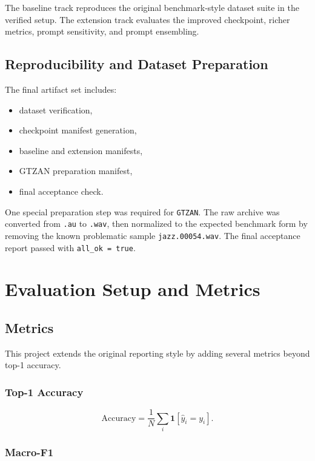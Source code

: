 \documentclass[11pt]{article}
\newcommand{\dataset}[1]{\texttt{#1}}
\begin{document}
The baseline track reproduces the original benchmark-style dataset suite in the
verified setup. The extension track evaluates the improved checkpoint, richer
metrics, prompt sensitivity, and prompt ensembling.

\subsection{Reproducibility and Dataset Preparation}

The final artifact set includes:
\begin{itemize}[leftmargin=1.25em]
  \item dataset verification,
  \item checkpoint manifest generation,
  \item baseline and extension manifests,
  \item GTZAN preparation manifest,
  \item final acceptance check.
\end{itemize}

One special preparation step was required for \dataset{GTZAN}. The raw archive
was converted from \dataset{.au} to \dataset{.wav}, then normalized to the
expected benchmark form by removing the known problematic sample
\dataset{jazz.00054.wav}. The final acceptance report passed with
\dataset{all\_ok = true}.

\section{Evaluation Setup and Metrics}

\subsection{Metrics}

This project extends the original reporting style by adding several metrics
beyond top-1 accuracy.

\subsubsection*{Top-1 Accuracy}

\begin{equation}
\text{Accuracy} = \frac{1}{N} \sum_i \mathbf{1}[\hat{y}_i = y_i].
\end{equation}

\subsubsection*{Macro-F1}
\end{document}
